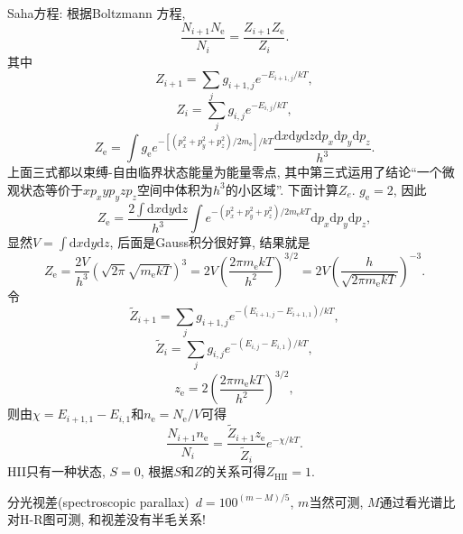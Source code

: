 Saha方程: 根据Boltzmann 方程,
\begin{equation*}
    \frac{N_{i+1}N_\text{e}}{N_{i}} = \frac{Z_{i+1}Z_\text{e}}{Z_{i}}.
\end{equation*}
其中
\begin{equation*}
    Z_{i+1} = \sum_j g_{i+1,j} e^{-E_{i+1,j}/kT},
\end{equation*}
\begin{equation*}
    Z_{i} = \sum_j g_{i,j} e^{-E_{i,j}/kT},
\end{equation*}
\begin{equation*}
    Z_\text{e} =  \int g_\text{e} e^{-[(p_x^2+p_y^2+p_z^2)/2m_\text{e}]/kT} \frac{\mathrm{d}x\mathrm{d}y\mathrm{d}z\mathrm{d}p_x\mathrm{d}p_y\mathrm{d}p_z}{h^3}.
\end{equation*}
上面三式都以束缚-自由临界状态能量为能量零点, 其中第三式运用了结论``一个微观状态等价于$xp_xyp_yzp_z$空间中体积为$h^3$的小区域''.
下面计算$Z_e$. $g_\text{e}=2$, 因此
\begin{equation*}
    Z_\text{e} = \frac{2\int\mathrm{d}x\mathrm{d}y\mathrm{d}z}{h^3} \int e^{-(p_x^2+p_y^2+p_z^2)/2m_\text{e}kT}\mathrm{d}p_x\mathrm{d}p_y\mathrm{d}p_z,
\end{equation*}
显然$V=\int\mathrm{d}x\mathrm{d}y\mathrm{d}z$, 后面是Gauss积分很好算, 结果就是
\begin{equation*}
    Z_\text{e} = \frac{2V}{h^3} (\sqrt{2\pi}\sqrt{m_\text{e}kT})^3 = 2 V \left(\frac{2\pi m_\text{e}kT}{h^2}\right)^{3/2} = 2 V \left(\frac{h}{\sqrt{2\pi m_\text{e}kT}}\right)^{-3}.
\end{equation*}
令
\begin{equation*}
    \widetilde{Z}_{i+1}  = \sum_j g_{i+1,j} e^{-(E_{i+1,j}-E_{i+1,1})/kT},
\end{equation*}
\begin{equation*}
    \widetilde{Z}_{i}  = \sum_j g_{i,j} e^{-(E_{i,j}-E_{i,1})/kT},
\end{equation*}
\begin{equation*}
    z_\text{e}  = 2 \left(\frac{2\pi m_\text{e}kT}{h^2}\right)^{3/2},
\end{equation*}
则由$\chi=E_{i+1,1}-E_{i,1}$和$n_\text{e}=N_\text{e}/V$可得
\begin{equation*}
    \frac{N_{i+1}n_\text{e}}{N_{i}} = \frac{\widetilde{Z}_{i+1}z_\text{e}}{\widetilde{Z}_{i}}e^{-\chi/kT}.
\end{equation*}
HII只有一种状态, $S=0$, 根据$S$和$Z$的关系可得$Z_\text{HII}=1$.

分光视差(spectroscopic parallax)~$d=100^{(m-M)/5}$, $m$当然可测, $M$通过看光谱比对H-R图可测, 和视差没有半毛关系!
